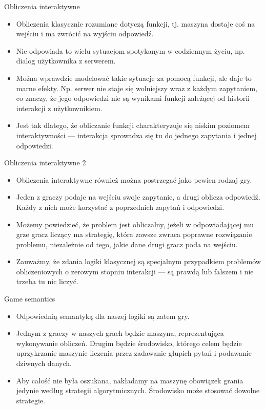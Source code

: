 \documentclass{beamer}
\begin{document}
\begin{frame}{Obliczenia interaktywne}
\begin{itemize}
	\item Obliczenia klasycznie rozumiane dotyczą funkcji, tj. maszyna dostaje coś na wejściu i ma zwrócić na wyjściu odpowiedź.
	\item Nie odpowiada to wielu sytuacjom spotykanym w codziennym życiu, np. dialog użytkownika z serwerem.
	\item Można wprawdzie modelować takie sytuacje za pomocą funkcji, ale daje to marne efekty. Np. serwer nie staje się wolniejszy wraz z każdym zapytaniem, co znaczy, że jego odpowiedzi nie są wynikami funkcji zależącej od historii interakcji z użytkownikiem. 
	\item Jest tak dlatego, że obliczanie funkcji charakteryzuje się niskim poziomem interaktywności — interakcja sprowadza się tu do jednego zapytania i jednej odpowiedzi.
\end{itemize}
\end{frame}

\begin{frame}{Obliczenia interaktywne 2}
\begin{itemize}
	\item Obliczenia interaktywne również można postrzegać jako pewien rodzaj gry.
	\item Jeden z graczy podaje na wejściu swoje zapytanie, a drugi oblicza odpowiedź. Każdy z nich może korzystać z poprzednich zapytań i odpowiedzi.
	\item Możemy powiedzieć, że problem jest obliczalny, jeżeli w odpowiadającej mu grze gracz liczący ma strategię, która zawsze zwraca poprawne rozwiązanie problemu, niezależnie od tego, jakie dane drugi gracz poda na wejściu.
	\item Zauważmy, że zdania logiki klasycznej są specjalnym przypadkiem problemów obliczeniowych o zerowym stopniu interakcji — są prawdą lub fałszem i nie trzeba tu nic liczyć.
\end{itemize}
\end{frame}

\begin{frame}{Game semantics}
\begin{itemize}
	\item Odpowiednią semantyką dla naszej logiki są zatem gry.
	\item Jednym z graczy w naszych grach będzie maszyna, reprezentująca wykonywanie obliczeń. Drugim będzie środowisko, którego celem będzie uprzykrzanie maszynie liczenia przez zadawanie głupich pytań i podawanie dziwnych danych.
	\item Aby całość nie była oszukana, nakładamy na maszynę obowiązek grania jedynie według strategii algorytmicznych. Środowisko może stosować dowolne strategie.
\end{itemize}
\end{frame}
\end{document}
